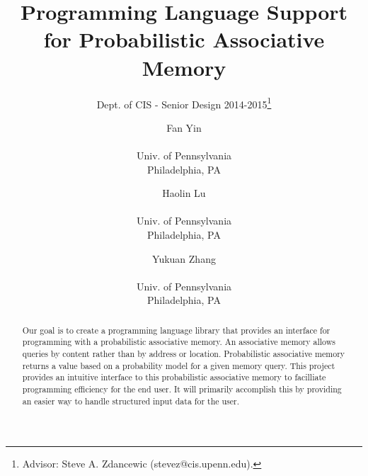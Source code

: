 \documentclass{sig-alternate}
\begin{document}
 

\title{Programming Language Support for Probabilistic Associative Memory}
\subtitle{Dept. of CIS - Senior Design 2014-2015\thanks{Advisor: Steve A. Zdancewic (stevez@cis.upenn.edu).}}
\author{
    Fan Yin \\  \\Univ. of Pennsylvania \\ Philadelphia, PA
    \and Haolin Lu \\  \\Univ. of Pennsylvania \\ Philadelphia, PA
    \and Yukuan Zhang\\  \\Univ. of Pennsylvania \\ Philadelphia, PA
}
%
%
\date{}
\maketitle


\begin{abstract}
    Our goal is to create a programming language library that provides an interface
    for programming with a probabilistic associative memory.  
    An associative memory allows queries by content rather than by address or location.
    Probabilistic associative memory returns a value based on a probability model
    for a given memory query. This project provides an intuitive interface to this probabilistic
    associative memory to facilliate programming efficiency for the end user. It will primarily 
    accomplish this by providing an easier way to handle structured input data for the user. 
\end{abstract}
\end{document}
